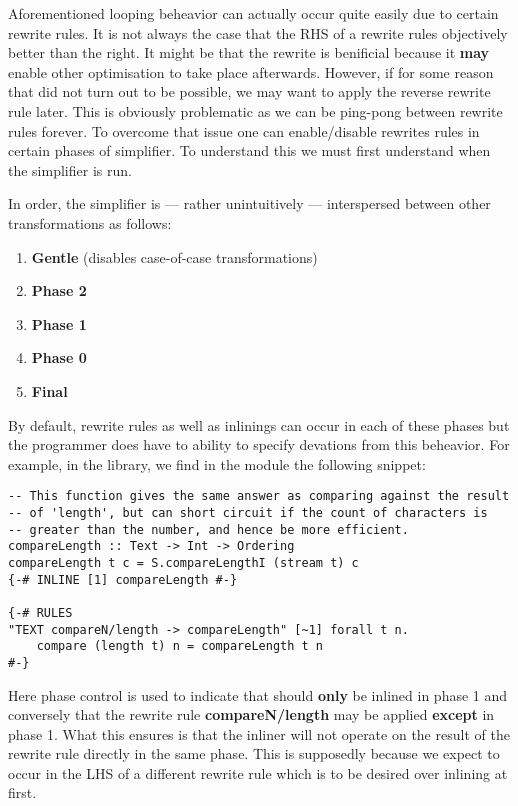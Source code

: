 Aforementioned looping beheavior can actually occur quite easily due to certain rewrite rules. It is not always the case that
the RHS of a rewrite rules objectively better than the right. It might be that the rewrite is benificial because it \textbf{may}
enable other optimisation to take place afterwards. However, if for some reason that did not turn out to be possible, we may want
to apply the reverse rewrite rule later. This is obviously problematic as we can be ping-pong between rewrite rules forever.
To overcome that issue one can enable/disable rewrites rules in certain phases of simplifier. To understand this we must first
understand when the simplifier is run.

In order, the simplifier is --- rather unintuitively --- interspersed between other transformations as follows:

\begin{enumerate}
  \item \textbf{Gentle} (disables case-of-case transformations)
  \item \textbf{Phase 2}
  \item \textbf{Phase 1}
  \item \textbf{Phase 0}
  \item \textbf{Final}
\end{enumerate}

By default, rewrite rules as well as inlinings can occur in each of these phases but the programmer does have to ability
to specify devations from this beheavior. For example, in the  library, we find in the  module
the following snippet:

\begin{listing}[H]
\begin{verbatim}
-- This function gives the same answer as comparing against the result
-- of 'length', but can short circuit if the count of characters is
-- greater than the number, and hence be more efficient.
compareLength :: Text -> Int -> Ordering
compareLength t c = S.compareLengthI (stream t) c
{-# INLINE [1] compareLength #-}

{-# RULES
"TEXT compareN/length -> compareLength" [~1] forall t n.
    compare (length t) n = compareLength t n
#-}
\end{verbatim}
\end{listing}

Here phase control is used to indicate that  should \textbf{only} be inlined in phase 1 and conversely
that the rewrite rule \textbf{compareN/length} may be applied \textbf{except} in phase 1. What this ensures is that the inliner
will not operate on the result of the rewrite rule directly in the same phase. This is supposedly because we expect 
to occur in the LHS of a different rewrite rule which is to be desired over inlining at first.

